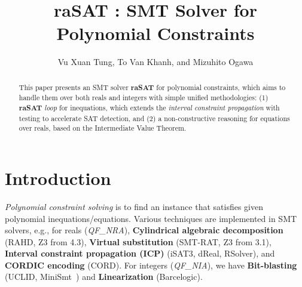 \documentclass[runningheads,a4paper,oribibl]{llncs}
\begin{document}
%

\title{raSAT : SMT Solver for Polynomial Constraints} 
\author{Vu Xuan Tung, To Van Khanh, and Mizuhito Ogawa} 


\maketitle

\begin{abstract}
  This paper presents an SMT solver {\bf raSAT} for polynomial constraints, 
  which aims to handle them over both reals and integers with
  simple unified methodologies: (1) {\bf raSAT} {\em loop} for inequations,
  which extends the \emph{interval constraint propagation}
  with testing to accelerate SAT detection, and 
  (2) a non-constructive reasoning for equations over reals,
  based on the Intermediate Value Theorem. 
\end{abstract}


\section{Introduction}
{\em Polynomial constraint solving} is to find an instance that satisfies given
polynomial inequations/equations. Various techniques are implemented in SMT solvers,
e.g., for reals (\emph{QF\_NRA}), 
{\bf Cylindrical algebraic decomposition}
(RAHD\cite{Passmore09combineddecision}, 
  Z3 from 4.3\cite{Jovanovic13}), 
{\bf Virtual substitution} (SMT-RAT\cite{smtrat}, 
  Z3 from 3.1), 
{\bf Interval constraint propagation (ICP)}\cite{benhamou:hal-00480814}
(iSAT3\cite{isat}, dReal\cite{dRealCADE13}, RSolver\cite{rsolver}),
and 
{\bf CORDIC encoding} (CORD\cite{cordic}). 
For integers (\emph{QF\_NIA}), we have 
{\bf Bit-blasting} (UCLID\cite{Bryant07decidingbit-vector}, 
  MiniSmt~\cite{Zankl:2010:SNR:1939141.1939168}) and 
{\bf Linearization} (Barcelogic\cite{Barcelogic08}). 
\end{document}
